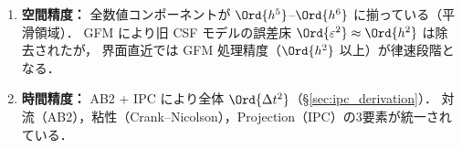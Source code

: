 \begin{tcolorbox}[warnbox, title={精度ミスマッチと設計上のトレードオフ}]
\begin{enumerate}
  \item \textbf{空間精度：}
        全数値コンポーネントが $\Ord{h^5}$--$\Ord{h^6}$ に揃っている（平滑領域）．
        GFM により旧 CSF モデルの誤差床 $\Ord{\varepsilon^2} \approx \Ord{h^2}$ は除去されたが，
        界面直近では GFM 処理精度（$\Ord{h^2}$ 以上）が律速段階となる．

  \item \textbf{時間精度：}
        AB2 + IPC により全体 $\Ord{\Delta t^2}$（§\ref{sec:ipc_derivation}）．
        対流（AB2），粘性（Crank--Nicolson），Projection（IPC）の3要素が統一されている．
\end{enumerate}
\end{tcolorbox}
